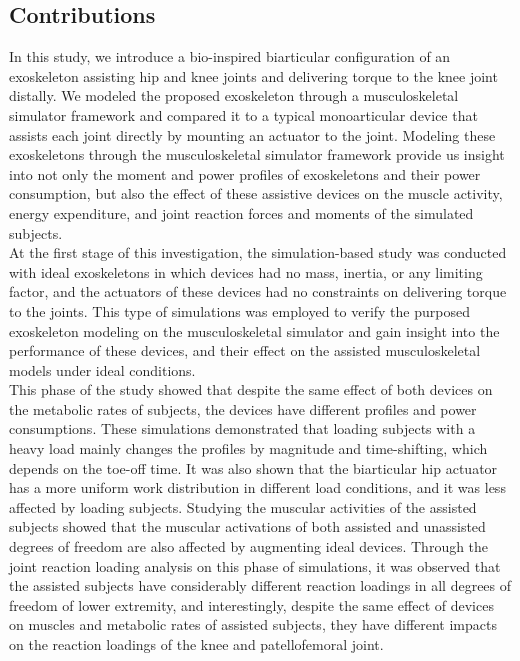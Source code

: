 \documentclass[10pt,letterpaper]{article}
\begin{document}
\subsection*{Contributions}
In this study, we introduce a bio-inspired biarticular configuration of an exoskeleton assisting hip and knee joints and delivering torque to the knee joint distally.  We modeled the proposed exoskeleton through a musculoskeletal simulator framework and compared it to a typical monoarticular device that assists each joint directly by mounting an actuator to the joint. Modeling these exoskeletons through the musculoskeletal simulator framework provide us insight into not only the moment and power profiles of exoskeletons and their power consumption, but also the effect of these assistive devices on the muscle activity, energy expenditure, and joint reaction forces and moments of the simulated subjects.\\
At the first stage of this investigation, the simulation-based study was conducted with ideal exoskeletons in which devices had no mass, inertia, or any limiting factor, and the actuators of these devices had no constraints on delivering torque to the joints. This type of simulations was employed to verify the purposed exoskeleton modeling on the musculoskeletal simulator and gain insight into the performance of these devices, and their effect on the assisted musculoskeletal models under ideal conditions.\\
This phase of the study showed that despite the same effect of both devices on the metabolic rates of subjects, the devices have different profiles and power consumptions. These simulations demonstrated that loading subjects with a heavy load mainly changes the profiles by magnitude and time-shifting, which depends on the toe-off time. It was also shown that the biarticular hip actuator has a more uniform work distribution in different load conditions, and it was less affected by loading subjects. Studying the muscular activities of the assisted subjects showed that the muscular activations of both assisted and unassisted degrees of freedom are also affected by augmenting ideal devices. Through the joint reaction loading analysis on this phase of simulations, it was observed that the assisted subjects have considerably different reaction loadings in all degrees of freedom of lower extremity, and interestingly, despite the same effect of devices on muscles and metabolic rates of assisted subjects, they have different impacts on the reaction loadings of the knee and patellofemoral joint.\\
\end{document}
